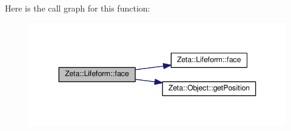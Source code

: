 Here is the call graph for this function\+:\nopagebreak
\begin{figure}[H]
\begin{center}
\leavevmode
\includegraphics[width=344pt]{classZeta_1_1Lifeform_a6072092d3346c643511439e9a203e3cd_cgraph}
\end{center}
\end{figure}


